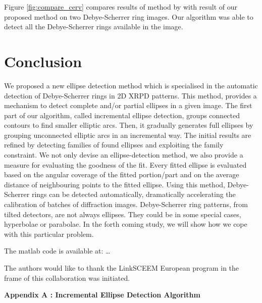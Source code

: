 \documentclass[preprint]{iucr}              %
\newcommand\dsr{Debye-Scherrer ring}
\newcommand\dsrs{Debye-Scherrer rings}
\begin{document}
Figure \ref{fig:compare_cerv} compares results of method by
\cite{cervellino2006folding} with result of our proposed method on two {\dsr}
images.  
Our algorithm was able to detect all the {\dsrs} available in the image.

\section{Conclusion}
We proposed a new ellipse detection method which is specialised in the automatic
detection of \dsrs{} in 2D XRPD patterns. 
This method, provides a mechanism to detect complete and/or partial ellipses in
a given image. 
The first part of our algorithm, called incremental ellipse detection, groups
connected contours to find smaller elliptic arcs. 
Then, it gradually generates full ellipses by grouping unconnected elliptic arcs
in an incremental way. 
The initial results are refined by detecting families of found ellipses and
exploiting the family constraint. 
We not only devise an ellipse-detection method, we also provide a measure for
evaluating the goodness of the fit. 
Every fitted ellipse is evaluated based on the angular coverage of the fitted
portion/part and on the average distance of neighbouring points to the fitted
ellipse.
 Using this method, \dsrs{} can be detected automatically, dramatically
 accelerating the calibration of batches of  diffraction images. 
\dsr{} patterns, from tilted detectors, are not always ellipses.
They could be in some special cases, hyperbolae or parabolae.
In the forth coming study, we will show how we cope with this particular
problem. 

The matlab code is available at: \ldots

The authors would like to thank the LinkSCEEM European program in the frame of  
this collaboration was initiated. 
 




\pagebreak
\appendix \textbf{Appendix A : Incremental Ellipse Detection Algorithm}
\end{document}
